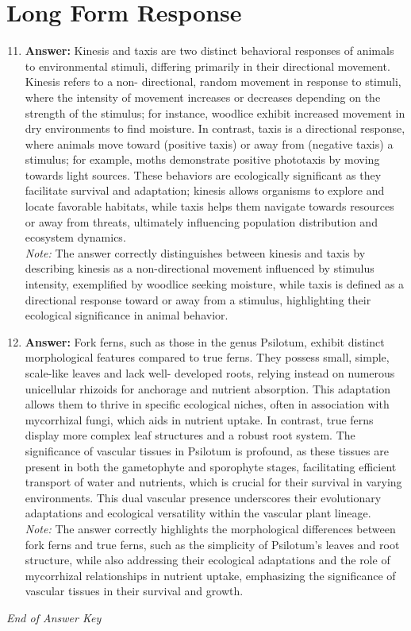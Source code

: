 \documentclass[12pt]{article}
\begin{document}
\section*{Long Form Response}
\begin{enumerate}[label=\arabic*.]
\setcounter{enumi}{10}
\item \textbf{Answer:} Kinesis and taxis are two distinct behavioral responses of animals to environmental stimuli, differing primarily in their directional movement. Kinesis refers to a non- directional, random movement in response to stimuli, where the intensity of movement increases or decreases depending on the strength of the stimulus; for instance, woodlice exhibit increased movement in dry environments to find moisture. In contrast, taxis is a directional response, where animals move toward (positive taxis) or away from (negative taxis) a stimulus; for example, moths demonstrate positive phototaxis by moving towards light sources. These behaviors are ecologically significant as they facilitate survival and adaptation; kinesis allows organisms to explore and locate favorable habitats, while taxis helps them navigate towards resources or away from threats, ultimately influencing population distribution and ecosystem dynamics.
\\ \textit{Note:} The answer correctly distinguishes between kinesis and taxis by describing kinesis as a non-directional movement influenced by stimulus intensity, exemplified by woodlice seeking moisture, while taxis is defined as a directional response toward or away from a stimulus, highlighting their ecological significance in animal behavior.
\item \textbf{Answer:} Fork ferns, such as those in the genus Psilotum, exhibit distinct morphological features compared to true ferns. They possess small, simple, scale-like leaves and lack well- developed roots, relying instead on numerous unicellular rhizoids for anchorage and nutrient absorption. This adaptation allows them to thrive in specific ecological niches, often in association with mycorrhizal fungi, which aids in nutrient uptake. In contrast, true ferns display more complex leaf structures and a robust root system. The significance of vascular tissues in Psilotum is profound, as these tissues are present in both the gametophyte and sporophyte stages, facilitating efficient transport of water and nutrients, which is crucial for their survival in varying environments. This dual vascular presence underscores their evolutionary adaptations and ecological versatility within the vascular plant lineage.
\\ \textit{Note:} The answer correctly highlights the morphological differences between fork ferns and true ferns, such as the simplicity of Psilotum's leaves and root structure, while also addressing their ecological adaptations and the role of mycorrhizal relationships in nutrient uptake, emphasizing the significance of vascular tissues in their survival and growth.
\end{enumerate}

\vfill
\noindent\textit{End of Answer Key}
\end{document}
